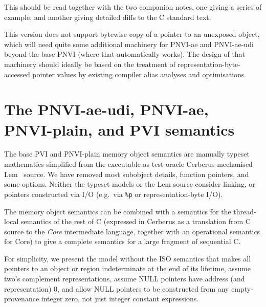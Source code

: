 \documentclass[acmsmall,review,screen]{acmart}\settopmatter{printfolios=true,printccs=false,printacmref=false}
\begin{document}
This should be read together with the two companion notes, one giving 
a series of example, and another giving detailed diffs to the
C standard text. 



{\color{red}This version does not support bytewise copy of a pointer
 to an unexposed object, which will need quite some additional
 machinery for PNVI-ae and PNVI-ae-udi beyond the base PNVI (where
 that automatically works).  The design of that machinery should
 ideally be based on the treatment of representation-byte-accessed
 pointer values by existing compiler alias analyses and optimisations.}



\section{The PNVI-ae-udi, PNVI-ae, PNVI-plain, and PVI semantics}

The base PVI and PNVI-plain memory object semantics are manually typeset mathematics simplified from the
executable-as-test-oracle
Cerberus
mechanised Lem~\cite{Lem-icfp2014} source. We have removed most subobject details, function
pointers, and some options.  Neither the typeset models or
the Lem source consider linking, or pointers constructed via I/O
(e.g.~via
\texttt{\%p} or representation-byte I/O).

The memory object semantics can be combined with a semantics for the
thread-local semantics of the rest of C (expressed in Cerberus as a
translation from C source to the \emph{Core} intermediate language,
together with an operational semantics for Core) to give a complete
semantics for a large fragment of sequential C. 


For simplicity, we present the model without the ISO semantics that makes all
pointers to an object or region indeterminate at the end of its lifetime,
assume two's complement representations, assume NULL pointers have
address (and representation) $0$, and allow NULL pointers to be constructed from any
empty-provenance integer zero, not just integer constant expressions.
\end{document}

